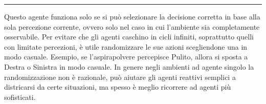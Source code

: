 \documentclass{article}
\begin{document}
\par\noindent\rule{\textwidth}{0.4pt}
Questo agente funziona solo se si può selezionare la decisione corretta in base alla sola percezione corrente, ovvero solo nel caso in cui l'ambiente sia completamente osservabile.\newline
\noindent Per evitare che gli agenti caschino in cicli infiniti, soprattutto quelli con limitate percezioni, è utile randomizzare le sue azioni scegliendone una in modo casuale.\newline
\noindent Esempio, se l'aspirapolvere percepisce Pulito, allora si sposta a Destra o Sinistra in modo casuale. In genere negli ambienti ad agente singolo la randomizzazione non è razionale, può aiutare gli agenti reattivi semplici a districarsi da certe situazioni, ma spesso è meglio ricorrere ad agenti più sofisticati.
\newpage
\end{document}
